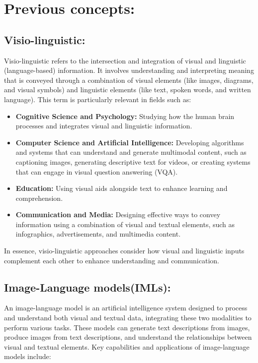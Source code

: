 \section{Previous concepts:}

\subsection{Visio-linguistic:}
\noindent Visio-linguistic refers to the intersection and integration of visual and linguistic (language-based) information. It involves understanding and interpreting meaning that is conveyed through a combination of visual elements (like images, diagrams, and visual symbols) and linguistic elements (like text, spoken words, and written language). This term is particularly relevant in fields such as:

\begin{itemize}
\item \textbf{Cognitive Science and Psychology:} Studying how the human brain processes and integrates visual and linguistic information.
\item \textbf{Computer Science and Artificial Intelligence:} Developing algorithms and systems that can understand and generate multimodal content, such as captioning images, generating descriptive text for videos, or creating systems that can engage in visual question answering (VQA).
\item \textbf{Education:} Using visual aids alongside text to enhance learning and comprehension.
\item \textbf{Communication and Media:} Designing effective ways to convey information using a combination of visual and textual elements, such as infographics, advertisements, and multimedia content.
\end{itemize}
In essence, visio-linguistic approaches consider how visual and linguistic inputs complement each other to enhance understanding and communication.

\subsection{Image-Language models(IMLs):}
\noindent An image-language model is an artificial intelligence system designed to process and understand both visual and textual data, integrating these two modalities to perform various tasks. These models can generate text descriptions from images, produce images from text descriptions, and understand the relationships between visual and textual elements. Key capabilities and applications of image-language models include:


